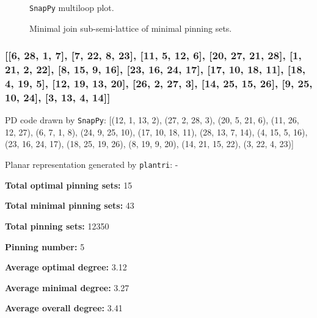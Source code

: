 \documentclass{article}%
\begin{document}
\begin{multicols}{2}
\begin{figure}[H]
\centering

\caption{\texttt{SnapPy} multiloop plot.}
\label{fig:tex/img/[[8, 14, 1, 9], [9, 15, 10, 22], [7, 21, 8, 22], [13, 28, 14, 23], [1, 16, 2, 15], [10, 26, 11, 25], [6, 24, 7, 25], [20, 23, 21, 24], [12, 4, 13, 5], [27, 16, 28, 17], [2, 27, 3, 26], [11, 18, 12, 19.svg}
\end{figure}
\columnbreak

\begin{figure}[H]
\centering
\scalebox{0.8}{}
\caption{Minimal join sub-semi-lattice of minimal pinning sets.}
\label{fig:tex/img/[[8, 14, 1, 9], [9, 15, 10, 22], [7, 21, 8, 22], [13, 28, 14, 23], [1, 16, 2, 15], [10, 26, 11, 25], [6, 24, 7, 25], [20, 23, 21, 24], [12, 4, 13, 5], [27, 16, 28, 17], [2, 27, 3, 26], [11, 18, 12, 19.pgf}
\end{figure}
\end{multicols}

\newpage

\subsubsection{[[6, 28, 1, 7], [7, 22, 8, 23], [11, 5, 12, 6], [20, 27, 21, 28], [1, 21, 2, 22], [8, 15, 9, 16], [23, 16, 24, 17], [17, 10, 18, 11], [18, 4, 19, 5], [12, 19, 13, 20], [26, 2, 27, 3], [14, 25, 15, 26], [9, 25, 10, 24], [3, 13, 4, 14]]}

{\small\noindent PD code drawn by \texttt{SnapPy}: [(12, 1, 13, 2), (27, 2, 28, 3), (20, 5, 21, 6), (11, 26, 12, 27), (6, 7, 1, 8), (24, 9, 25, 10), (17, 10, 18, 11), (28, 13, 7, 14), (4, 15, 5, 16), (23, 16, 24, 17), (18, 25, 19, 26), (8, 19, 9, 20), (14, 21, 15, 22), (3, 22, 4, 23)]}

{\small\noindent Planar representation generated by \texttt{plantri}: -}

\begin{multicols}{2}
{\normalsize \noindent\textbf{Total optimal pinning sets:} 15

\noindent\textbf{Total minimal pinning sets:} 43

\noindent\textbf{Total pinning sets:} 12350

\noindent\textbf{Pinning number:} 5

}
\columnbreak

{\normalsize \noindent\textbf{Average optimal degree:} 3.12

\noindent\textbf{Average minimal degree:} 3.27

\noindent\textbf{Average overall degree:} 3.41

}
\end{multicols}
\end{document}
